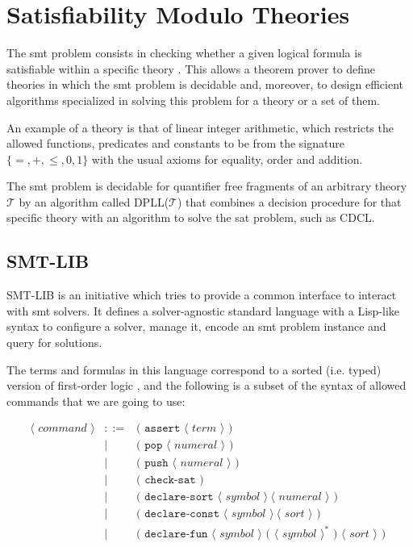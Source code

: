\section{Satisfiability Modulo Theories}

The \gls{smt} problem consists in checking whether a given logical formula is
satisfiable within a specific theory \citep{smtLibStandard}. This allows a 
theorem prover to define theories in which the \gls{smt} problem is decidable
and, moreover, to design efficient algorithms specialized in solving this
problem for a theory or a set of them.

An example of a theory is that of linear integer arithmetic, which restricts the
allowed functions, predicates and constants to be from the signature $\{=, +,
\leq, 0, 1\}$ with the usual axioms for equality, order and addition.

The \gls{smt} problem is decidable for quantifier free fragments of an arbitrary
theory $\mathcal{T}$ by an algorithm called DPLL($\mathcal{T}$) \citep{DPLL}
that combines a decision procedure for that specific theory with an algorithm to
solve the \gls{sat} problem, such as CDCL. 

\subsection{SMT-LIB}
\label{prelim:smtlib}

SMT-LIB is an initiative which tries to provide a common interface to interact
with \acrshort{smt} solvers. It defines a solver-agnostic standard language with
a Lisp-like syntax to configure a solver, manage it, encode an \gls{smt} problem
instance and query for solutions.

The terms and formulas in this language correspond to a sorted (i.e. typed) 
version of first-order logic \citep{smtLibStandard}, and the following is a
subset of the syntax of allowed commands that we are going to use:

\[
\begin{array}{rcll}
\langle\textit{ command }\rangle & ::= & \texttt{( assert } \langle\textit{ term }\rangle\texttt{ ) }\\
& | & \texttt{( pop } \langle\textit{ numeral }\rangle \texttt{ ) }\\
& | & \texttt{( push } \langle\textit{ numeral }\rangle \texttt{ ) }\\
& | & \texttt{( check-sat )}\\
& | & \texttt{( declare-sort } \langle\textit{ symbol }\rangle~\langle\textit{ numeral }\rangle\texttt{ ) }\\
& | & \texttt{( declare-const } \langle\textit{ symbol }\rangle~\langle\textit{ sort }\rangle\texttt{ ) }\\
& | & \texttt{( declare-fun } \langle\textit{ symbol }\rangle \texttt{ ( }\langle\textit{ symbol }\rangle^* \texttt{ ) }\langle\textit{ sort }\rangle\texttt{ ) }\\
\end{array}
\]

